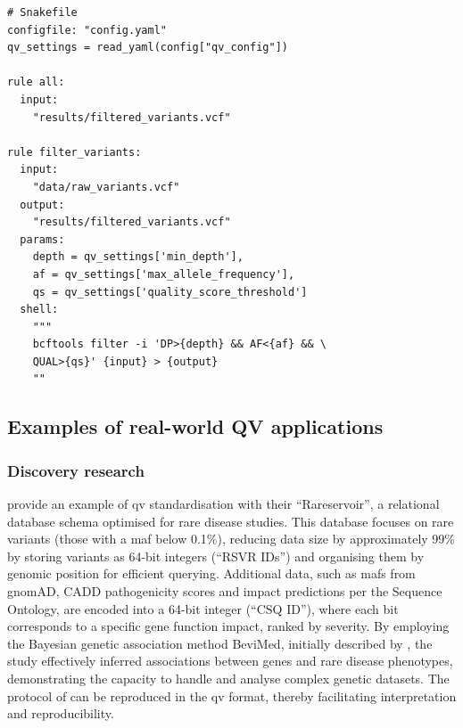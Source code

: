 \begin{tcolorbox}[
    breakable,  %
    colback=white!0,  %
    colframe=black,  %
    boxrule=1pt,  %
    arc=1mm,  %
    outer arc=1mm,
     title=\textbf{\refstepcounter{myboxcounter}\label{box:qv_variables_example_workflow3}Box \themyboxcounter: Example worflow manager - python}
]
\begin{verbatim}
# Snakefile
configfile: "config.yaml"
qv_settings = read_yaml(config["qv_config"])

rule all:
  input:
    "results/filtered_variants.vcf"

rule filter_variants:
  input:
    "data/raw_variants.vcf"
  output:
    "results/filtered_variants.vcf"
  params:
    depth = qv_settings['min_depth'],
    af = qv_settings['max_allele_frequency'],
    qs = qv_settings['quality_score_threshold']
  shell:
    """
    bcftools filter -i 'DP>{depth} && AF<{af} && \
    QUAL>{qs}' {input} > {output}
    ""
\end{verbatim}
\end{tcolorbox}

\subsection{Examples of real-world QV applications}

\subsubsection{Discovery research}
\citet{greene2023genetic} provide an example of \ac{qv} standardisation with their ``Rareservoir'', a relational database schema optimised for rare disease studies. This database focuses on rare variants (those with a \ac{maf} below 0.1\%), reducing data size by approximately 99\% by storing variants as 64-bit integers (``RSVR IDs'') and organising them by genomic position for efficient querying. Additional data, such as \ac{maf}s from gnomAD, CADD pathogenicity scores and impact predictions per the Sequence Ontology, are encoded into a 64-bit integer (``CSQ ID''), where each bit corresponds to a specific gene function impact, ranked by severity. By employing the Bayesian genetic association method BeviMed, initially described by \citet{greene2017fast}, the study effectively inferred associations between genes and rare disease phenotypes, demonstrating the capacity to handle and analyse complex genetic datasets. The protocol of \citet{greene2023genetic} can be reproduced in the \ac{qv} format, thereby facilitating interpretation and reproducibility.


